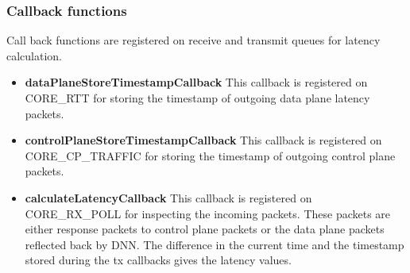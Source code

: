 \documentclass{article}
\begin{document}
\subsubsection{Callback functions}
Call back functions are registered on receive and transmit queues for latency calculation.
\begin{itemize}
    \item \textbf{dataPlaneStoreTimestampCallback}
          This callback is registered on CORE\_RTT for storing the timestamp of outgoing  data plane latency packets.
    \item \textbf{controlPlaneStoreTimestampCallback} This callback is registered on CORE\_CP\_TRAFFIC for storing the timestamp of outgoing control plane packets.
    \item \textbf{calculateLatencyCallback} This callback is registered on CORE\_RX\_POLL for inspecting the incoming packets.
          These packets are either response packets to control plane packets or the data plane packets reflected back by DNN. The difference in the current time and the timestamp stored during the tx callbacks gives the latency values.
\end{itemize}
\end{document}

